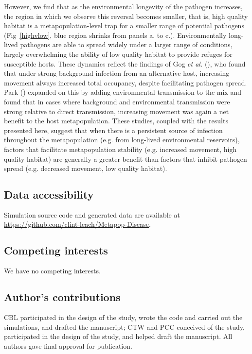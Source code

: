 \documentclass{article}
\begin{document}
However, we find that as the environmental longevity of the pathogen increases, the region in which we observe this reversal becomes smaller, that is, high quality habitat is a metapopulation-level trap for a smaller range of potential pathogens (Fig~\ref{highvlow}, blue region shrinks from panels a. to c.).  
Environmentally long-lived pathogens are able to spread widely under a larger range of conditions, largely overwhelming the ability of low quality habitat to provide refuges for susceptible hosts. 
These dynamics reflect the findings of Gog \emph{et al.} (\cite{Gog2002}), who found that under strong background infection from an alternative host, increasing movement always increased total occupancy, despite facilitating pathogen spread.  
Park (\cite{Park2012}) expanded on this by adding environmental transmission to the mix and found that in cases where background and environmental transmission were strong relative to direct transmission, increasing movement was again a net benefit to the host metapopulation.  
These studies, coupled with the results presented here, suggest that when there is a persistent source of infection throughout the metapopulation (e.g. from long-lived environmental reservoirs), factors that facilitate metapopulation stability (e.g. increased movement, high quality habitat) are generally a greater benefit than factors that inhibit pathogen spread (e.g. decreased movement, low quality habitat). 


\subsection*{Data accessibility}
Simulation source code and generated data are available at \\  \url{https://github.com/clint-leach/Metapop-Disease}.

\subsection*{Competing interests}
We have no competing interests.

\subsection*{Author's contributions}
CBL participated in the design of the study, wrote the code and carried out the simulations, and drafted the manuscript; CTW and PCC conceived of the study, participated in the design of the study, and helped draft the manuscript.  All authors gave final approval for publication.
\end{document}
